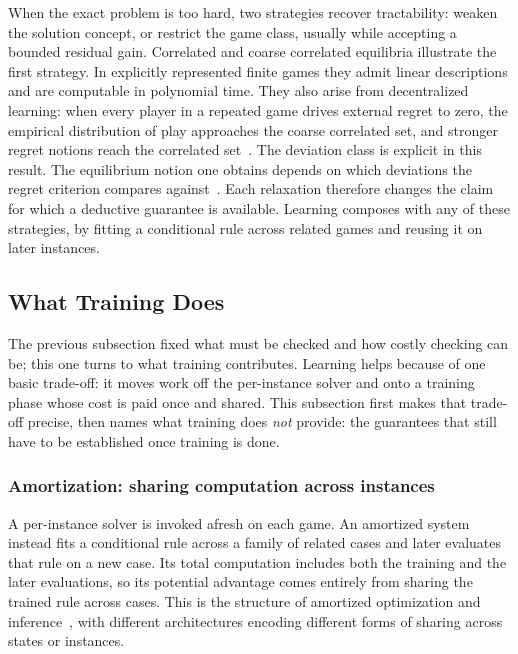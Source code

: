 When the exact problem is too hard, two strategies recover tractability: weaken the
solution concept, or restrict the game class, usually while accepting a bounded residual gain. Correlated and coarse correlated equilibria illustrate the first
strategy. In explicitly represented finite games they admit linear descriptions and are
computable in polynomial time. They also arise from decentralized learning:
when every player in a repeated game drives external regret to zero, the
empirical distribution of play approaches the coarse correlated set, and
stronger regret notions reach the correlated
set~\citep{Hannan1957,HartMasColell2000,BlumMansour2007}. The deviation class is explicit in this result. The equilibrium notion one
obtains depends on which deviations the regret criterion compares
against~\citep{GordonGreenwaldMarks2008}. Each relaxation therefore changes
the claim for which a deductive guarantee is available. Learning composes with any of these
strategies, by fitting a conditional rule across related games and reusing it on later
instances.

\subsection{What Training Does}
\label{subsec:recap-dl}

The previous subsection fixed what must be checked and how costly checking can
be; this one turns to what training contributes. Learning helps because of one basic trade-off: it moves work off the per-instance solver and onto a
training phase whose cost is paid once and shared. This subsection first makes that trade-off precise, then names what training does \emph{not} provide: the guarantees that still
have to be established once training is done.

\subsubsection{Amortization: sharing computation across instances}

A per-instance solver is invoked afresh on each game. An amortized system instead fits a conditional rule across a family of related
cases and later evaluates that rule on a new case. Its total computation
includes both the training and the later evaluations, so its potential
advantage comes entirely from sharing the trained rule across cases. This is the structure of amortized optimization and
inference~\citep{Amos2022Amortized,KingmaWelling2014}, with different
architectures encoding different forms of sharing across states or instances.

